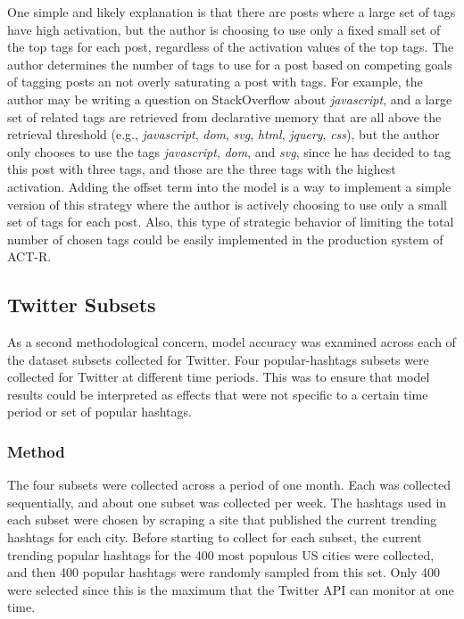 \documentclass[man,floatsintext,donotrepeattitle]{apa6}
\begin{document}
One simple and likely explanation is that there are posts where a large set of tags have high activation,
but the author is choosing to use only a fixed small set of the top tags for each post, regardless of the activation values of the top tags.
The author determines the number of tags to use for a post based on competing goals of tagging posts an not overly saturating a post with tags.
For example, the author may be writing a question on StackOverflow about \emph{javascript}, and a large set of related tags are retrieved from declarative memory that are all above the retrieval threshold
(e.g., \emph{javascript}, \emph{dom}, \emph{svg}, \emph{html}, \emph{jquery}, \emph{css}),
but the author only chooses to use the tags \emph{javascript}, \emph{dom}, and \emph{svg}, since he has decided to tag this post with three tags, and those are the three tags with the highest activation.
Adding the offset term into the model is a way to implement a simple version of this strategy where the author is actively choosing to use only a small set of tags for each post.
Also, this type of strategic behavior of limiting the total number of chosen tags could be easily implemented in the production system of ACT-R.

\subsection{Twitter Subsets}

As a second methodological concern, model accuracy was examined across each of the dataset subsets collected for Twitter.
Four popular-hashtags subsets were collected for Twitter at different time periods.
This was to ensure that model results could be interpreted as effects that were not specific to a certain time period or set of popular hashtags.

\subsubsection{Method}

The four subsets were collected across a period of one month.
Each was collected sequentially, and about one subset was collected per week.
The hashtags used in each subset were chosen by scraping a site that published the current trending hashtags for each city.
Before starting to collect for each subset, the current trending popular hashtags for the 400 most populous US cities were collected, and then 400 popular hashtags were randomly sampled from this set.
Only 400 were selected since this is the maximum that the Twitter API can monitor at one time.
\end{document}
